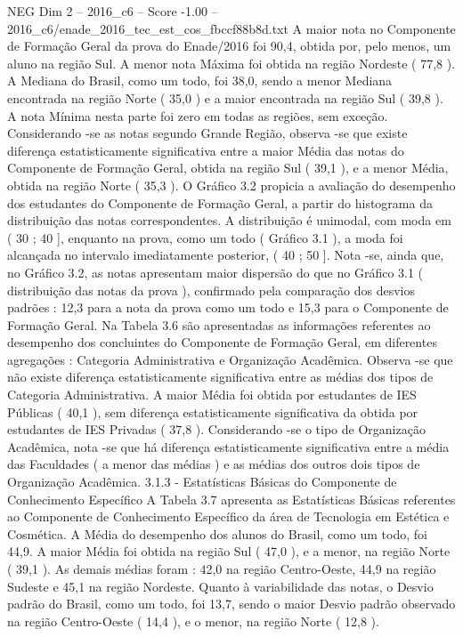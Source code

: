 \begin{textsample}{NEG Dim 2 – 2016\_c6 – Score -1.00 – 2016\_c6/enade\_2016\_tec\_est\_cos\_fbccf88b8d.txt}
A maior nota no Componente de Formação Geral da prova do Enade/2016 foi 90,4, obtida por, pelo menos, um aluno na região Sul.
A menor nota Máxima foi obtida na região Nordeste ( 77,8 ).
A Mediana do Brasil, como um todo, foi 38,0, sendo a menor Mediana encontrada na região Norte ( 35,0 ) e a maior encontrada na região Sul ( 39,8 ).
A nota Mínima nesta parte foi zero em todas as regiões, sem exceção.
Considerando -se as notas segundo Grande Região, observa -se que existe diferença estatisticamente significativa entre a maior Média das notas do Componente de Formação Geral, obtida na região Sul ( 39,1 ), e a menor Média, obtida na região Norte ( 35,3 ).
O Gráfico 3.2 propicia a avaliação do desempenho dos estudantes do Componente de Formação Geral, a partir do histograma da distribuição das notas correspondentes.
A distribuição é unimodal, com moda em ( 30 ; 40 ], enquanto na prova, como um todo ( Gráfico 3.1 ), a moda foi alcançada no intervalo imediatamente posterior, ( 40 ; 50 ].
Nota -se, ainda que, no Gráfico 3.2, as notas apresentam maior dispersão do que no Gráfico 3.1 ( distribuição das notas da prova ), confirmado pela comparação dos desvios padrões : 12,3 para a nota da prova como um todo e 15,3 para o Componente de Formação Geral.
Na Tabela 3.6 são apresentadas as informações referentes ao desempenho dos concluintes do Componente de Formação Geral, em diferentes agregações : Categoria Administrativa e Organização Acadêmica.
Observa -se que não existe diferença estatisticamente significativa entre as médias dos tipos de Categoria Administrativa.
A maior Média foi obtida por estudantes de IES Públicas ( 40,1 ), sem diferença estatisticamente significativa da obtida por estudantes de IES Privadas ( 37,8 ).
Considerando -se o tipo de Organização Acadêmica, nota -se que há diferença estatisticamente significativa entre a média das Faculdades ( a menor das médias ) e as médias dos outros dois tipos de Organização Acadêmica. 3.1.3 - Estatísticas Básicas do Componente de Conhecimento Específico A Tabela 3.7 apresenta as Estatísticas Básicas referentes ao Componente de Conhecimento Específico da área de Tecnologia em Estética e Cosmética.
A Média do desempenho dos alunos do Brasil, como um todo, foi 44,9.
A maior Média foi obtida na região Sul ( 47,0 ), e a menor, na região Norte ( 39,1 ).
As demais médias foram : 42,0 na região Centro-Oeste, 44,9 na região Sudeste e 45,1 na região Nordeste.
Quanto à variabilidade das notas, o Desvio padrão do Brasil, como um todo, foi 13,7, sendo o maior Desvio padrão observado na região Centro-Oeste ( 14,4 ), e o menor, na região Norte ( 12,8 ).

\end{textsample}
